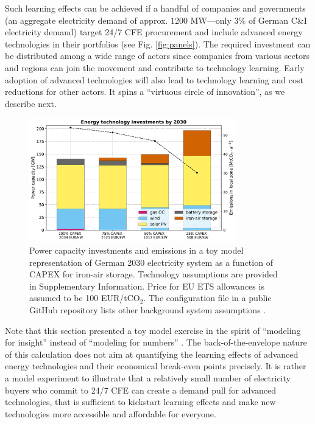 \documentclass[pdflatex,sn-basic, Numbered]{sn-jnl}
\theoremstyle{thmstyleone}%
\theoremstyle{thmstyletwo}%
\theoremstyle{thmstylethree}%
\begin{document}
Such learning effects can be achieved if a handful of companies and governments (an aggregate electricity demand of approx. 1200 MW---only 3\% of German C\&I electricity demand) target 24/7 CFE procurement and include advanced energy technologies in their portfolios (see Fig. \ref{fig:panels}). The required investment can be distributed among a wide range of actors since companies from various sectors and regions can join the movement and contribute to technology learning. Early adoption of advanced technologies will also lead to technology learning and cost reductions for other actors. It spins a \enquote{virtuous circle of innovation}, as we describe next.

\begin{figure}[htbp]
    \centering
    \includegraphics[width=0.8\textwidth]{images/dashboard_3.pdf}
    \caption{Power capacity investments and emissions in a toy model representation of German 2030 electricity system as a function of CAPEX for iron-air storage. Technology assumptions are provided in Supplementary Information. Price for EU ETS allowances is assumed to be 100 EUR/tCO$_2$. The configuration file in a public GitHub repository lists other background system assumptions \cite{code247CFE}.}\label{fig:impact}
\end{figure}

Note that this section presented a toy model exercise in the spirit of \enquote{modeling for insight} instead of \enquote{modeling for numbers} \cite{huntingtonModelingInsightsNot1982}. The back-of-the-envelope nature of this calculation does not aim at quantifying the learning effects of advanced energy technologies and their economical break-even points precisely.
It is rather a model experiment to illustrate that a relatively small number of electricity buyers who commit to 24/7 CFE can create a demand pull for advanced technologies, that is sufficient to kickstart learning effects and make new technologies more accessible and affordable for everyone.
\end{document}
